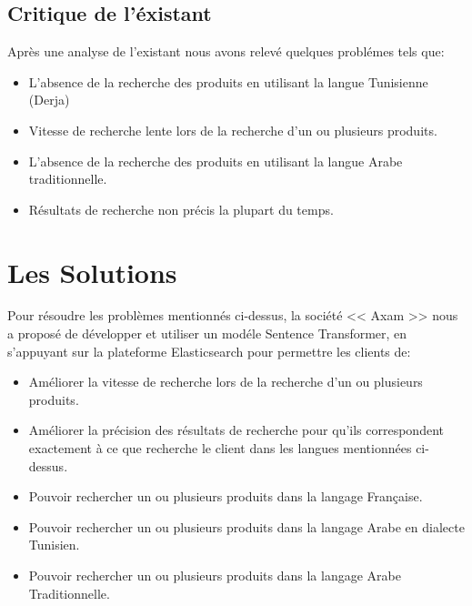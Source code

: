 \subsection{Critique de l'éxistant}
\noindent
Après une analyse de l'existant nous avons relevé quelques problémes tels que:

\renewcommand\labelitemi{$\bullet$}
\begin{itemize}
    \item L'absence de la recherche des produits en utilisant la langue Tunisienne (Derja) 
    \item Vitesse de recherche lente lors de la recherche d'un ou plusieurs produits.
    \item L'absence de la recherche des produits en utilisant la langue Arabe traditionnelle.
    \item Résultats de recherche non précis la plupart du temps.
\end{itemize}

\newpage
\section{Les Solutions}
\noindent
Pour résoudre les problèmes mentionnés ci-dessus, la société << Axam >> nous a proposé de développer et utiliser un modéle Sentence Transformer, en s'appuyant sur la plateforme Elasticsearch pour permettre les clients de:

\renewcommand\labelitemi{$\bullet$}
\begin{itemize}
    \item Améliorer la vitesse de recherche lors de la recherche d’un ou plusieurs produits.

    \item Améliorer la précision des résultats de recherche pour qu'ils correspondent exactement à ce que recherche le client dans les langues mentionnées ci-dessus.

    \item Pouvoir rechercher un ou plusieurs produits dans la langage Française.

    \item Pouvoir rechercher un ou plusieurs produits dans la langage Arabe en dialecte Tunisien.

    \item Pouvoir rechercher un ou plusieurs produits dans la langage Arabe Traditionnelle.
\end{itemize}